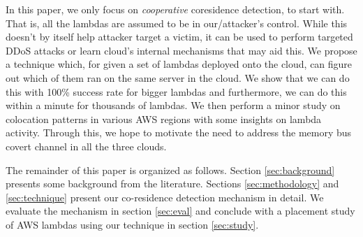 In this paper, we only focus on \emph{cooperative} coresidence detection, to start with.
That is, all the lambdas are assumed to be in our/attacker's control. While this doesn't 
by itself help attacker target a victim, it can be used to perform targeted DDoS attacks 
or learn cloud's internal mechanisms that may aid this. We propose a technique which, for given a set of lambdas deployed onto the cloud, can figure out which of them 
ran on the same server in the cloud. We show that we can do this with 100\% success 
rate for bigger lambdas and furthermore, we can do this within a minute for thousands 
of lambdas. We then perform a minor study on colocation patterns in various AWS 
regions with some insights on lambda activity.  Through this,
we hope to motivate the need to address the memory bus covert channel in all the three clouds.


The remainder of this paper is organized as follows. Section \ref{sec:background} presents some background from the literature. Sections \ref{sec:methodology} and \ref{sec:technique} present our co-residence detection mechanism in detail. We evaluate the mechanism in section \ref{sec:eval} and conclude with a placement study of AWS lambdas using our technique in section \ref{sec:study}.  

